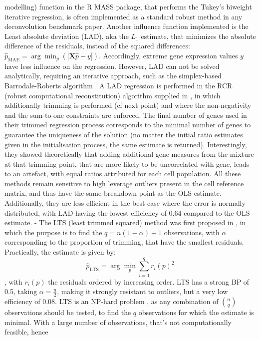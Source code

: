 modelling) function in the R MASS package, that performs the Tukey's
biweight iterative regression, is often implemented as a standard robust
method in any deconvolution benchmark paper. Another influence function
implemented is the Least absolute deviation (LAD), aka the \(L_1\)
estimate, that minimizes the absolute difference of the residuals,
instead of the squared differences:
\(\hat{p}_{\text{MAE}} = \arg \min_{\hat{p}} \left( |\boldsymbol{X}\hat{p} - y| \right)\).
Accordingly, extreme gene expression values \(y\) have less influence on
the regression. However, LAD can not be solved analytically, requiring
an iterative approach, such as the simplex-based Barrodale-Roberts
algorithm \autocite{barrodale_roberts73}. A LAD regression is performed in the RCR (robust
computational reconstitution) algorithm supplied in
\autocite{hoffmann_etal06}, in
which additionally trimming is performed (cf next point) and where the
non-negativity and the sum-to-one constraints are enforced. The final
number of genes used in their trimmed regression process corresponds to
the minimal number of genes to guarantee the uniqueness of the solution
(no matter the initial ratio estimates given in the initialisation
process, the same estimate is returned). Interestingly, they showed
theoretically that adding additional gene measures from the mixture at
that trimming point, that are more likely to be uncorrelated with gene,
leads to an artefact, with equal ratios attributed for each cell
population. All these methods remain sensitive to high leverage outliers
present in the cell reference matrix, and thus have the same breakdown
point as the OLS estimate. Additionally, they are less efficient in the
best case where the error is normally distributed, with LAD having the
lowest efficiency of 0.64 compared to the OLS estimate. - The LTS (least
trimmed squared) method was first proposed in
\autocite{rousseeuw85}, in which the
purpose is to find the \(q= n(1- \alpha) + 1\) observations, with
\(\alpha\) corresponding to the proportion of trimming, that have the
smallest residuals. Practically, the estimate is given by: \[
\hat{p}_{\text{LTS}} =  \arg \min_{p} \sum_{i=1}^q r_i (p)^2
\], with \(r_i (p)\) the residuals ordered by increasing order. LTS has
a strong BP of 0.5, taking \(\alpha=\frac{n}{2}\), making it strongly
resistant to outliers, but a very low efficiency of 0.08. LTS is an
NP-hard problem \autocite{rousseeuw85},
as any combination of \(\binom{n}{q}\) observations should be tested, to
find the \(q\) observations for which the estimate is minimal. With a
large number of observations, that's not computationally feasible, hence
